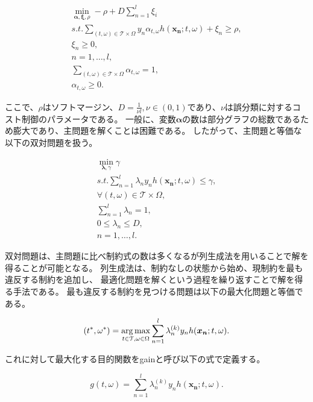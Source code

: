 \begin{eqnarray}
	\min_{\bm{\alpha},\bm{\xi},\rho} -\rho + D \sum_{n=1}^{l} \xi_{i}\\
	s.t. \sum_{(t,\omega) \in \mathcal{T} \times \Omega} y_{n} \alpha_{t,\omega} h(\bm{x_{n}};t,\omega) + \xi_{n} \geq \rho,\\
	 \xi_{n} \geq 0,\nonumber \\
	 n = 1, \dots , l,\nonumber \\
	 \sum_{(t,\omega) \in \mathcal{T} \times \Omega} \alpha_{t, \omega} = 1, \nonumber\\
	 \alpha_{t, \omega} \geq 0. \nonumber
\end{eqnarray}

ここで、$\rho$はソフトマージン、$D=\frac{1}{\nu l}, \nu \in (0,1)$であり、$\nu$は誤分類に対するコスト制御のパラメータである。
一般に、変数$\bm{\alpha}$の数は部分グラフの総数であるため膨大であり、主問題を解くことは困難である。
したがって、主問題と等価な以下の双対問題を扱う。

\begin{eqnarray}
	\min_{\bm{\lambda},\gamma} \gamma\\
	s.t. \sum_{n=1}^{l} \lambda_{n} y_{n} h(\bm{x_{n}};t,\omega) \leq \gamma,\\
	\forall(t,\omega) \in \mathcal{T} \times \Omega, \nonumber\\
	\sum_{n=1}^{l} \lambda_{n} = 1, \nonumber\\
	0 \leq \lambda_{n} \leq D, \nonumber\\
	n = 1, \dots , l. \nonumber
\end{eqnarray}

双対問題は、主問題に比べ制約式の数は多くなるが列生成法を用いることで解を得ることが可能となる。
列生成法は、制約なしの状態から始め、現制約を最も違反する制約を追加し、
最適化問題を解くという過程を繰り返すことで解を得る手法である。
最も違反する制約を見つける問題は以下の最大化問題と等価である。

\begin{equation}
	(t^{*}, \omega^{*}) = \operatorname*{arg\,max}_{t \in \mathcal{T} , \omega \in \Omega} \sum_{n=1}^{l} \lambda_{n}^{(k)} y_{n} h(\bm{x_{n}} ; t, \omega).
\end{equation}

これに対して最大化する目的関数をgainと呼び以下の式で定義する。

\begin{equation}
	g(t, \omega) = \sum_{n=1}^{l} \lambda_{n}^{(k)} y_{n} h(\bm{x_{n}} ; t, \omega).
\end{equation}

